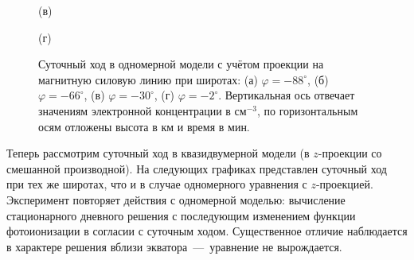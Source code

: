 \documentclass[14pt, a4paper, fleqn]{extarticle}
\begin{document}
\begin{figure}[H]

(в)
\end{figure}

\begin{figure}[H]

(г)
\caption{Суточный ход в одномерной модели с учётом проекции на магнитную силовую линию при широтах: (а) $\varphi = -88^\circ$, (б) $\varphi = -66^\circ$, (в) $\varphi = -30^\circ$, (г) $\varphi = -2^\circ$. Вертикальная ось отвечает значениям электронной концентрации в см$^{-3}$, по горизонтальным осям отложены высота в км и время в мин.}
\end{figure}



Теперь рассмотрим суточный ход в квазидвумерной модели (в $z$-проекции со смешанной производной). На следующих графиках представлен суточный ход при тех же широтах, что и в случае одномерного уравнения с $z$-проекцией. Эксперимент повторяет действия с одномерной моделью: вычисление стационарного дневного решения с последующим изменением функции фотоионизации в согласии с суточным ходом. Существенное отличие наблюдается в характере решения вблизи экватора~---~уравнение не вырождается. 
\end{document}
